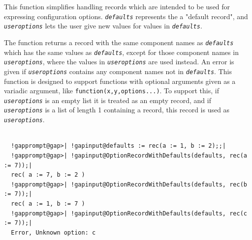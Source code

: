 \documentclass[a4paper,11pt]{report}
\begin{document}
{{{ This function simplifies handling records which are intended to be used for
expressing configuration options. \mbox{\texttt{\mdseries\slshape defaults}} represents the a "default record", and \mbox{\texttt{\mdseries\slshape useroptions}} lets the user give new values for values in \mbox{\texttt{\mdseries\slshape defaults}}. 

 The function returns a record with the same component names as \mbox{\texttt{\mdseries\slshape defaults}} which has the same values as \mbox{\texttt{\mdseries\slshape defaults}}, except for those component names in \mbox{\texttt{\mdseries\slshape useroptions}}, where the values in \mbox{\texttt{\mdseries\slshape useroptions}} are used instead. An error is given if \mbox{\texttt{\mdseries\slshape useroptions}} contains any component names not in \mbox{\texttt{\mdseries\slshape defaults}}. This function is designed to support functions with optional arguments given
as a variadic argument, like \texttt{function(x,y,options...)}. To support this, if \mbox{\texttt{\mdseries\slshape useroptions}} is an empty list it is treated as an empty record, and if \mbox{\texttt{\mdseries\slshape useroptions}} is a list of length 1 containing a record, this record is used as \mbox{\texttt{\mdseries\slshape useroptions}}. 

 }

 
\begin{Verbatim}[commandchars=!@|,fontsize=\small,frame=single,label=Example]
  
  !gapprompt@gap>| !gapinput@defaults := rec(a := 1, b := 2);;|
  !gapprompt@gap>| !gapinput@OptionRecordWithDefaults(defaults, rec(a := 7));|
  rec( a := 7, b := 2 )
  !gapprompt@gap>| !gapinput@OptionRecordWithDefaults(defaults, rec(b := 7));|
  rec( a := 1, b := 7 )
  !gapprompt@gap>| !gapinput@OptionRecordWithDefaults(defaults, rec(c := 7));|
  Error, Unknown option: c
  
\end{Verbatim}
 }

 }

         
\end{document}
